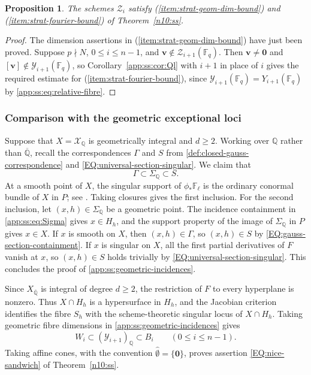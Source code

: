 \documentclass[a4paper,11pt, twoside,reqno]{amsart}
\theoremstyle{plain}
\newtheorem{prop}[thm]{Proposition}
\theoremstyle{definition}
\theoremstyle{remark}
\newcommand{\bfv}{\bm{v}}
\newcommand{\QQ}{\mathbb{Q}}
\renewcommand{\leq}{\leqslant}
\renewcommand{\ge}{\geqslant}
\newcommand{\FF}{\mathbb{F}}
\newcommand{\Qbar}{\overline{\mathbb{Q}}}
\newcommand{\cone}{\widehat}
\numberwithin{equation}{section}
\begin{document}
\begin{prop}\label{app:ss:prop:global}
The schemes $\mathcal Z_i$ satisfy (\ref{item:strat-geom-dim-bound})
and (\ref{item:strat-fourier-bound}) of Theorem~\ref{n10:ss}.
\end{prop}
\begin{proof}
The dimension assertions in (\ref{item:strat-geom-dim-bound})
have just been proved.
Suppose $p\nmid N$,
$0\leq i\leq n-1$, and $\bfv\notin \mathcal Z_{i+1}(\FF_q)$.
Then $\bfv\neq\bm0$ and $[\bfv]\notin\mathcal Y_{i+1}(\FF_q)$, so
Corollary~\ref{app:ss:cor:Ql} with $i+1$ in place of $i$
gives the required estimate for (\ref{item:strat-fourier-bound}),
since $\mathcal Y_{i+1}(\FF_q) = Y_{i+1}(\FF_q)$ by \eqref{app:ss:eq:relative-fibre}.
\end{proof}


\subsubsection{Comparison with the geometric exceptional loci}
Suppose that $X = \mathcal X_\QQ$ is geometrically integral and $d\ge 2$.
Working over $\QQ$ rather than $\Qbar$,
recall the correspondences
$\Gamma$ and $S$ from \eqref{def:closed-gauss-correspondence} and
\eqref{EQ:universal-section-singular}. We claim that
\begin{equation}\label{app:ss:geometric-incidences}
 \Gamma\subset\Sigma_{\QQ}\subset S.
\end{equation}
At a smooth point of $X$, the singular support of
$\phi_*\FF_\ell$ is the ordinary conormal bundle of $X$ in $P$;
see \cite[Lemmas~2.3(i) and~2.5(ii)]{Bei}.
Taking closures gives the first inclusion. For the second inclusion,
let $(x,h)\in\Sigma_{\QQ}$ be a geometric point. The incidence
containment in \eqref{app:ss:eq:Sigma} gives $x\in H_h$, and the support property
of the image of $\Sigma_{\QQ}$ in $P$ gives
$x\in X$. If $x$ is smooth on $X$, then $(x,h)\in \Gamma$, so $(x,h)\in S$ by \eqref{EQ:gauss-section-containment}.
If $x$ is singular on $X$, all the first partial derivatives of $F$ vanish at $x$,
so $(x,h)\in S$ holds trivially by \eqref{EQ:universal-section-singular}.
This concludes the proof of \eqref{app:ss:geometric-incidences}.

Since $X_{\Qbar}$ is integral of degree $d\ge 2$,
the restriction of $F$ to every hyperplane is nonzero.
Thus $X\cap H_h$ is a hypersurface in $H_h$,
and the Jacobian criterion identifies the fibre $S_h$
with the scheme-theoretic singular locus of $X\cap H_h$.
Taking geometric fibre dimensions in \eqref{app:ss:geometric-incidences} gives
\[
 W_i\subset (\mathcal Y_{i+1})_\QQ \subset B_i
 \qquad(0\leq i\leq n-1).
\]
Taking affine cones, with the convention
$\cone\emptyset=\{\bm0\}$, proves assertion \eqref{EQ:nice-sandwich} of
Theorem~\ref{n10:ss}.
\end{document}
